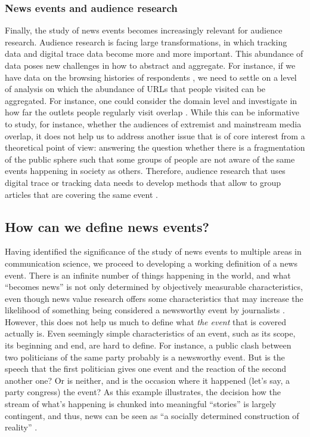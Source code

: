 \documentclass[a4paper,man,natbib,floatsintext,mask]{apa6}
\begin{document}
\subsubsection{News events and audience research}
Finally, the study of news events becomes increasingly relevant for audience research.
Audience research is facing large transformations, in which tracking data and digital trace data become more and more important. 
This abundance of data poses new challenges in how to abstract and aggregate.
For instance, if we have data on the browsing histories of respondents \citep[for a data collection tool, see][]{Menchen-Trevino2016}, we need to settle on a level of analysis on which the abundance of URLs that people visited can be aggregated.
For instance, one could consider the domain level and investigate in how far the outlets people regularly visit overlap \citep[e.g.,][]{Mukerjee2017}.
While this can be informative to study, for instance, whether the audiences of extremist and mainstream media overlap, it does not help us to address another issue that is of core interest from a theoretical point of view:
answering the question whether there is a fragmentation of the public sphere \citep[see, e.g.,][]{Marcinkowski2008} such that some groups of people are not aware of the same events happening in society as others.
Therefore, audience research that uses digital trace or tracking data needs to develop methods that allow to group articles that are covering the same event \citep[see also][]{Trillingnetwork}.



\subsection{How can we define news events?}
Having identified the significance of the study of news events to multiple areas in communication science, we proceed to developing a working definition of a news event.
There is an infinite number of things happening in the world, and what ``becomes news'' is not only determined by objectively measurable characteristics, even though news value research offers some characteristics that may increase the likelihood of something being considered a newsworthy event by journalists \citep[e.g.,][]{Eilders2006,Harcup2016}.
However, this does not help us much to define what \emph{the event} that is covered actually is.  
Even seemingly simple characteristics of an event, such as its scope, its beginning and end, are hard to define. For instance, a public clash between two politicians of the same party probably is a newsworthy event. But is the speech that the first politician gives one event and the reaction of the second another one? Or is neither, and is the occasion where it happened (let's say, a party congress) the event?
As this example illustrates, the decision how the stream of what's happening is chunked into meaningful ``stories'' is largely contingent, and thus, news can be seen as ``a socially determined construction of reality'' \citep[p.~428]{Staab1990}.
\end{document}
